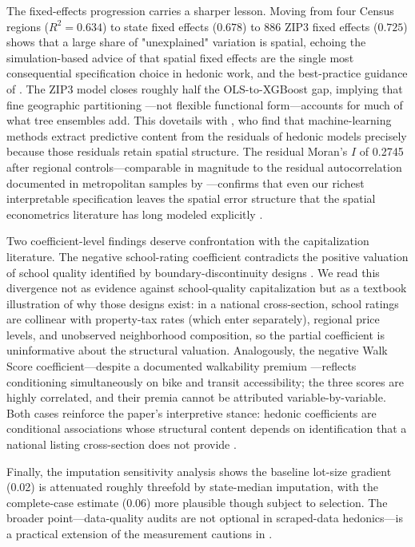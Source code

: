 The fixed-effects progression carries a sharper lesson. Moving from four Census
regions ($R^2 = 0.634$) to state fixed effects ($0.678$) to 886 ZIP3 fixed effects
($0.725$) shows that a large share of "unexplained" variation is spatial, echoing
the simulation-based advice of \citet{kuminoff2010which} that spatial fixed
effects are the single most consequential specification choice in hedonic work,
and the best-practice guidance of \citet{bishop2020best}. The ZIP3 model closes
roughly half the OLS-to-XGBoost gap, implying that fine geographic partitioning
---not flexible functional form---accounts for much of what tree ensembles add.
This dovetails with \citet{pace2020examining}, who find that machine-learning
methods extract predictive content from the residuals of hedonic models precisely
because those residuals retain spatial structure. The residual Moran's $I$ of
0.2745 after regional controls---comparable in magnitude to the residual
autocorrelation documented in metropolitan samples by \citet{basu1998analysis}
---confirms that even our richest interpretable specification leaves the spatial
error structure that the spatial econometrics literature has long modeled
explicitly \citep{anselin1988spatial, lesage2009introduction, dubin1998spatial}.

Two coefficient-level findings deserve confrontation with the capitalization
literature. The negative school-rating coefficient contradicts the positive
valuation of school quality identified by boundary-discontinuity designs
\citep{black1999better, bayer2007unified}. We read this divergence not as evidence
against school-quality capitalization but as a textbook illustration of why those
designs exist: in a national cross-section, school ratings are collinear with
property-tax rates (which enter separately), regional price levels, and unobserved
neighborhood composition, so the partial coefficient is uninformative about the
structural valuation. Analogously, the negative Walk Score coefficient---despite a
documented walkability premium \citep{pivo2011walkability}---reflects conditioning
simultaneously on bike and transit accessibility; the three scores are highly
correlated, and their premia cannot be attributed variable-by-variable. Both cases
reinforce the paper's interpretive stance: hedonic coefficients are conditional
associations whose structural content depends on identification that a national
listing cross-section does not provide \citep{kuminoff2013new}.

Finally, the imputation sensitivity analysis shows the baseline lot-size gradient
(0.02) is attenuated roughly threefold by state-median imputation, with the
complete-case estimate (0.06) more plausible though subject to selection. The
broader point---data-quality audits are not optional in scraped-data hedonics---is
a practical extension of the measurement cautions in \citet{bishop2020best}.

